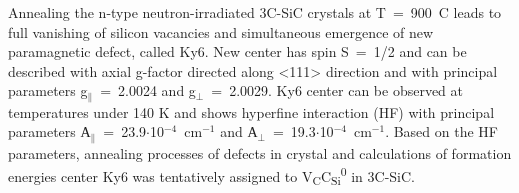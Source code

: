 Annealing the n-type neutron-irradiated 3C-SiC crystals at T~=~900~\degree C leads to full vanishing of silicon vacancies and simultaneous emergence of new paramagnetic defect, called Ky6. New center has spin S~=~1/2 and can be described with axial g-factor directed along <111> direction and with principal parameters g$_\parallel$~=~2.0024 and g$_\perp$~=~2.0029. Ky6 center can be observed at temperatures under 140 K and shows hyperfine interaction (HF) with principal parameters А$_\parallel$~=~23.9$\cdot$10$^{-4}$~cm$^{-1}$ and А$_\perp$~=~19.3$\cdot$10$^{-4}$~cm$^{-1}$. Based on the HF parameters, annealing processes of defects in crystal and calculations of formation energies \citep{met1,met2} center Ky6 was tentatively assigned to V\textsubscript{C}C\textsubscript{Si}\textsuperscript{0} in 3C-SiC.
